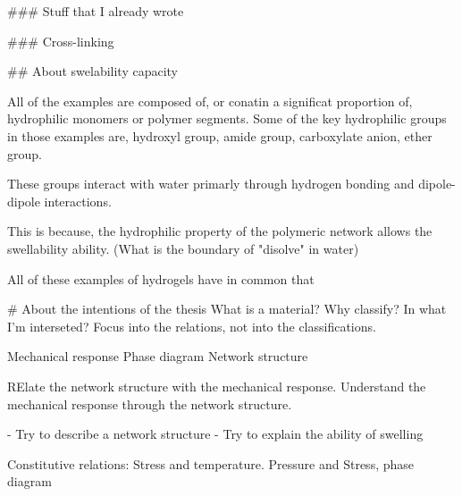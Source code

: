 ### Stuff that I already wrote


### Cross-linking

## About swelability capacity




All of the examples are composed of, or conatin a significat proportion of, hydrophilic monomers or polymer segments.
Some of the key hydrophilic groups in those examples are,
    hydroxyl group,
    amide group,
    carboxylate anion,
    ether group.


These groups interact with water primarly through hydrogen bonding and dipole-dipole interactions.



This is because, the hydrophilic property of the polymeric network allows the swellability ability.
(What is the boundary of "disolve" in water)

All of these examples of hydrogels have in common that 



# About the intentions of the thesis
What is a material?
Why classify?
In what I'm interseted?
Focus into the relations, not into the classifications.

Mechanical response
Phase diagram
Network structure

RElate the network structure with the mechanical response.
Understand the mechanical response through the network structure.

- Try to describe a network structure
- Try to explain the ability of swelling

Constitutive relations: Stress and temperature.
Pressure and Stress, phase diagram


